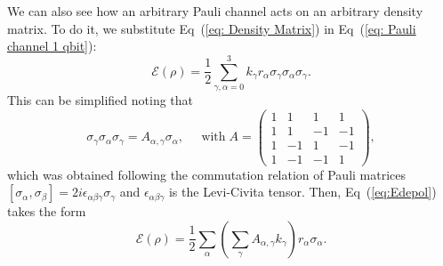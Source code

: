 \documentclass[10pt,letterpaper]{article} %
\newcommand{\eref}[1]{Eq~(\ref{#1})}
\begin{document}
We can also see how an arbitrary Pauli channel acts on an arbitrary  
density matrix.
To do it, we substitute \eref{eq: Density Matrix} 
in \eref{eq: Pauli channel 1 qbit}:
\begin{equation}
\mathcal{E}(\rho) = \dfrac{1}{2}\sum_{\gamma,\alpha=0}^3 k_{\gamma} r_{\alpha} \sigma_{\gamma} \sigma_{\alpha} \sigma_{\gamma}.
\label{eq:Edepol}
\end{equation}
This can be simplified noting that 
\begin{equation}
\sigma_{\gamma} \sigma_{\alpha} \sigma_{\gamma} = A_{\alpha,\gamma} \sigma_{\alpha}, \;\;\;\;\; \text{with} \; A = \begin{pmatrix}
1 & 1 & 1 & 1\\
1 & 1 & -1 &-1 \\
1 & -1 & 1 & -1 \\
1 & -1 & -1 & 1
\end{pmatrix},
\label{eq: propiedad-pauli}
\end{equation}
which was obtained following the 
commutation relation of Pauli matrices $[\sigma_\alpha,\sigma_\beta] = 2 i
\epsilon_{\alpha \beta \gamma} \sigma_\gamma$ and $\epsilon_{\alpha \beta \gamma}$ is 
the Levi-Civita tensor. Then, \eref{eq:Edepol} takes the form
% 
% 
% 
% 
% 
% 
% 
% 
\begin{equation}
\label{eq: rho-transformada}
\mathcal{E}(\rho) = \dfrac{1}{2} \sum_{\alpha} \left(\sum_{\gamma} A_{\alpha, \gamma} k_{\gamma} \right) r_{\alpha} \sigma_{\alpha}.
\end{equation}
\end{document}
